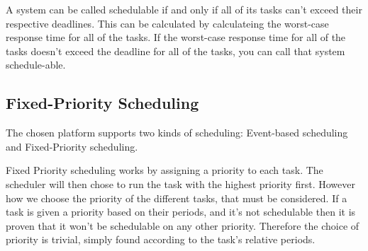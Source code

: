 A system can be called schedulable if and only if all of its tasks can't exceed their respective deadlines. This can be calculated by calculateing the worst-case response time for all of the tasks. If the worst-case response time for all of the tasks doesn't exceed the deadline for all of the tasks, you can call that system schedule-able.\cite{roadRules}










\subsection{\textbf{Fixed-Priority Scheduling}}\label{prioratySch}
The chosen platform supports two kinds of scheduling: Event-based scheduling and Fixed-Priority scheduling\cite{OILManual}.

Fixed Priority scheduling works by assigning a priority to each task. The scheduler will then chose to run the task with the highest priority first. However how we choose the priority of the different tasks,  that must be considered. If a task is given a priority based on their periods, and it's not schedulable then it is proven that it won't be schedulable on any other priority. Therefore the choice of priority is trivial, simply found according to the task's relative periods.

